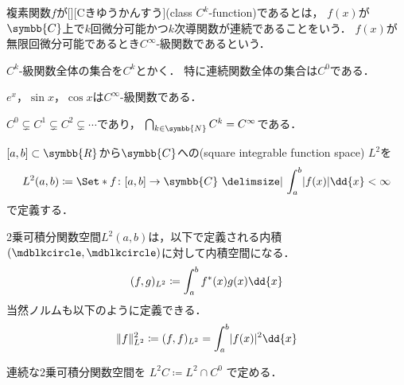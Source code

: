 \documentclass{sotsu}
\newif\ifdraft
\begin{document}
\begin{definition}
    \label{dfn:class-C^k-function}
    複素関数$f$が[][Cきゆうかんすう](class $C^k$-function)であるとは，
    $f(x)$が$\symbb{C}$上で$k$回微分可能かつ$k$次導関数が連続であることをいう．
    $f(x)$が無限回微分可能であるとき$C^\infty$-級関数であるという．

    $C^k$-級関数全体の集合を$C^k$とかく．
    特に連続関数全体の集合は$C^0$である．
\end{definition}

\begin{example}
    $e^x$，$\sin x$，$\cos x$は$C^\infty$-級関数である．
\end{example}

\begin{example}
    $C^0 \subsetneq C^1 \subsetneq C^2 \subsetneq \dotsb$であり，
    $\bigcap_{k \in \symbb{N}} C^k = C^\infty$である．
\end{example}


\begin{definition}
    \label{dfn:square-integrable-function-space}
    $[a, b] \subset \symbb{R}$から$\symbb{C}$への(square integrable function space) $L^2$を
    \begin{equation*}
        L^2 (a, b) \coloneq \Set*{ f \colon [a, b] \to \symbb{C}  \given  \int_a^b \abs{f(x)} \dd{x} < \infty }
    \end{equation*}
    で定義する．
\end{definition}

\begin{proposition}
    2乗可積分関数空間$L^2 (a, b)$は，以下で定義される内積$(\bigdot, \bigdot)$に対して内積空間になる．
    \begin{align}
        (f, g)_{L^2} \coloneq \int_a^b \conj{f}(x) g(x) \dd{x}
    \end{align}
    当然ノルムも以下のように定義できる．
    \begin{align}
        \norm{f}_{L^2}^2 \coloneq (f, f)_{L^2} = \int_a^b \abs{f(x)}^2 \dd{x}
    \end{align}
\end{proposition}

\begin{definition}
    連続な2乗可積分関数空間を
    \( L^2 C \coloneq L^2 \cap C^0 \)
    で定める．
\end{definition}
















\printbibheading

\printbibliography[
    keyword=set,
    heading=subbibliography,
    title={集合論}
]
\printbibliography[
    keyword=lin, 
    heading=subbibliography, 
    title={線形代数}
]




\ifdraft
\else
    \printindex
\fi
\end{document}
